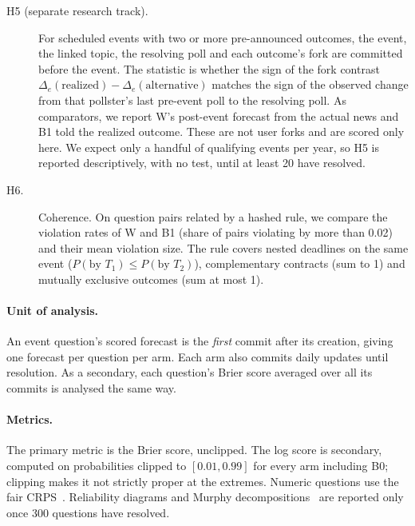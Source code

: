 \documentclass[11pt]{article}
\begin{document}
\begin{description}
  \item[H5 (separate research track).] For scheduled events with two or more pre-announced outcomes, the event, the linked topic, the resolving poll and each outcome's fork are committed before the event. The statistic is whether the sign of the fork contrast $\Delta_e(\text{realized})-\Delta_e(\text{alternative})$ matches the sign of the observed change from that pollster's last pre-event poll to the resolving poll. As comparators, we report W's post-event forecast from the actual news and B1 told the realized outcome. These are not user forks and are scored only here. We expect only a handful of qualifying events per year, so H5 is reported descriptively, with no test, until at least 20 have resolved.
  \item[H6.] Coherence. On question pairs related by a hashed rule, we compare the violation rates of W and B1 (share of pairs violating by more than 0.02) and their mean violation size. The rule covers nested deadlines on the same event ($P(\text{by }T_1)\le P(\text{by }T_2)$), complementary contracts (sum to 1) and mutually exclusive outcomes (sum at most 1).
\end{description}

\paragraph{Unit of analysis.} An event question's scored forecast is the \emph{first} commit after its creation, giving one forecast per question per arm. Each arm also commits daily updates until resolution. As a secondary, each question's Brier score averaged over all its commits is analysed the same way.

\paragraph{Metrics.} The primary metric is the Brier score, unclipped. The log score is secondary, computed on probabilities clipped to $[0.01,0.99]$ for every arm including B0; clipping makes it not strictly proper at the extremes. Numeric questions use the fair CRPS~\citep{ferro2014fair}. Reliability diagrams and Murphy decompositions~\citep{murphy1973new} are reported only once 300 questions have resolved.
\end{document}
